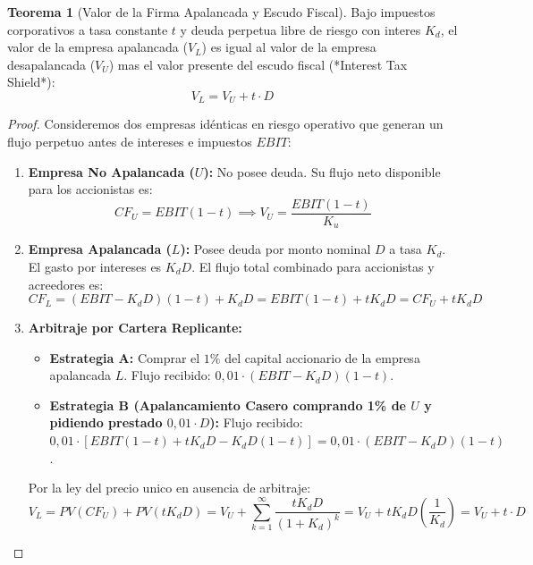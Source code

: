 \documentclass[10pt,a4paper]{article}
\theoremstyle{definition}
\newtheorem{teorema}{\color{primary}\textbf{Teorema}}[section]
\begin{document}
\begin{teorema}[Valor de la Firma Apalancada y Escudo Fiscal]
Bajo impuestos corporativos a tasa constante $t$ y deuda perpetua libre de riesgo con interes $K_d$, el valor de la empresa apalancada ($V_L$) es igual al valor de la empresa desapalancada ($V_U$) mas el valor presente del escudo fiscal (*Interest Tax Shield*):
\begin{equation}
V_L = V_U + t \cdot D
\end{equation}
\end{teorema}

\begin{proof}
Consideremos dos empresas idénticas en riesgo operativo que generan un flujo perpetuo antes de intereses e impuestos $EBIT$:
\begin{enumerate}
    \item \textbf{Empresa No Apalancada ($U$):} No posee deuda. Su flujo neto disponible para los accionistas es:
    \begin{equation}
    CF_U = EBIT(1 - t) \implies V_U = \frac{EBIT(1 - t)}{K_u}
    \end{equation}
    \item \textbf{Empresa Apalancada ($L$):} Posee deuda por monto nominal $D$ a tasa $K_d$. El gasto por intereses es $K_d D$. El flujo total combinado para accionistas y acreedores es:
    \begin{equation}
    CF_L = (EBIT - K_d D)(1 - t) + K_d D = EBIT(1 - t) + t K_d D = CF_U + t K_d D
    \end{equation}
    \item \textbf{Arbitraje por Cartera Replicante:}
    \begin{itemize}
        \item \textbf{Estrategia A:} Comprar el $1\%$ del capital accionario de la empresa apalancada $L$. Flujo recibido: $0,01 \cdot (EBIT - K_d D)(1 - t)$.
        \item \textbf{Estrategia B (Apalancamiento Casero comprando 1\% de $U$ y pidiendo prestado $0,01 \cdot D$):}
        Flujo recibido: $0,01 \cdot [EBIT(1 - t) + t K_d D - K_d D(1 - t)] = 0,01 \cdot (EBIT - K_d D)(1 - t)$.
    \end{itemize}
    Por la ley del precio unico en ausencia de arbitraje:
    \begin{equation}
    V_L = PV(CF_U) + PV(t K_d D) = V_U + \sum_{k=1}^{\infty} \frac{t K_d D}{(1 + K_d)^k} = V_U + t K_d D \left( \frac{1}{K_d} \right) = V_U + t \cdot D
    \end{equation}
\end{enumerate}
\end{proof}
\end{document}

